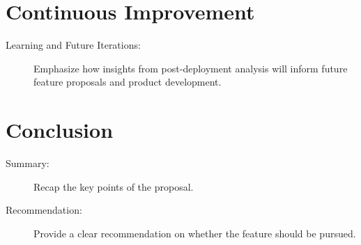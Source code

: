 \documentclass{article}
\begin{document}
\section{Continuous Improvement}
\begin{description}
    \item[Learning and Future Iterations:] Emphasize how insights from post-deployment analysis will inform future feature proposals and product development.
\end{description}

\section{Conclusion}
\begin{description}
    \item[Summary:] Recap the key points of the proposal.
    \item[Recommendation:] Provide a clear recommendation on whether the feature should be pursued.
\end{description}

\vspace*{\fill}
\hrulefill
\vspace*{\fill}

\newpage 

\tableofcontents

\end{document}
